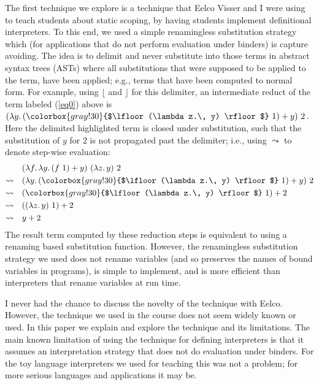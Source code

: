 The first technique we explore is a technique that Eelco Visser and I were using to teach students about static scoping, by having students implement definitional interpreters.
To this end, we used a simple renamingless substitution strategy which (for applications that do not perform evaluation under binders) is capture avoiding.
The idea is to delimit and never substitute into those terms in abstract syntax trees (ASTs) where all substitutions that were supposed to be applied to the term, have been applied; e.g., terms that have been computed to normal form.
For example, using $\lfloor$ and $\rfloor$ for this delimiter, an intermediate reduct of the term labeled (\ref{eq0}) above is $(\lambda y.\, (\colorbox{gray!30}{$\lfloor (\lambda z.\, y) \rfloor$}\ 1) + y)\ 2$.
Here the delimited \colorbox{gray!30}{highlighted} term is closed under substitution, such that the substitution of $y$ for $2$ is not propagated past the delimiter; i.e., using $\leadsto$ to denote step-wise evaluation:
\begin{align*}
  & (\lambda f .\, \lambda y .\, (f\ 1) + y)\ (\lambda z .\, y)\ 2
  \\
  \leadsto\quad & (\lambda y.\, (\colorbox{gray!30}{$\lfloor (\lambda z.\, y) \rfloor$}\ 1) + y)\ 2
  \\
  \leadsto\quad & (\colorbox{gray!30}{$\lfloor (\lambda z.\, y) \rfloor$}\ 1) + 2
  \\
  \leadsto\quad & ((\lambda z.\, y)\ 1) + 2
  \\
  \leadsto\quad & y + 2
\end{align*}
%
The result term computed by these reduction steps is equivalent to using a renaming based substitution function.
However, the renamingless substitution strategy we used does not rename variables (and so preserves the names of bound variables in programs), is simple to implement, and is more efficient than interpreters that rename variables at run time.

I never had the chance to discuss the novelty of the technique with Eelco.
However, the technique we used in the course does not seem widely known or used.
In this paper we explain and explore the technique and its limitations.
The main known limitation of using the technique for defining interpreters is that it assumes an interpretation strategy that does not do evaluation under binders.
For the toy language interpreters we used for teaching this was not a problem; for more serious languages and applications it may be.

